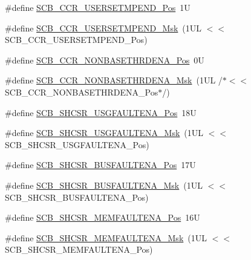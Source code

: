 \begin{DoxyCompactItemize}
\item 
\#define \hyperlink{group___c_m_s_i_s___s_c_b_ga789e41f45f59a8cd455fd59fa7652e5e}{S\+C\+B\+\_\+\+C\+C\+R\+\_\+\+U\+S\+E\+R\+S\+E\+T\+M\+P\+E\+N\+D\+\_\+\+Pos}~1U
\item 
\#define \hyperlink{group___c_m_s_i_s___s_c_b_ga4cf59b6343ca962c80e1885710da90aa}{S\+C\+B\+\_\+\+C\+C\+R\+\_\+\+U\+S\+E\+R\+S\+E\+T\+M\+P\+E\+N\+D\+\_\+\+Msk}~(1\+U\+L $<$$<$ S\+C\+B\+\_\+\+C\+C\+R\+\_\+\+U\+S\+E\+R\+S\+E\+T\+M\+P\+E\+N\+D\+\_\+\+Pos)
\item 
\#define \hyperlink{group___c_m_s_i_s___s_c_b_gab4615f7deb07386350365b10240a3c83}{S\+C\+B\+\_\+\+C\+C\+R\+\_\+\+N\+O\+N\+B\+A\+S\+E\+T\+H\+R\+D\+E\+N\+A\+\_\+\+Pos}~0U
\item 
\#define \hyperlink{group___c_m_s_i_s___s_c_b_gafe0f6be81b35d72d0736a0a1e3b4fbb3}{S\+C\+B\+\_\+\+C\+C\+R\+\_\+\+N\+O\+N\+B\+A\+S\+E\+T\+H\+R\+D\+E\+N\+A\+\_\+\+Msk}~(1\+U\+L /$\ast$$<$$<$ S\+C\+B\+\_\+\+C\+C\+R\+\_\+\+N\+O\+N\+B\+A\+S\+E\+T\+H\+R\+D\+E\+N\+A\+\_\+\+Pos$\ast$/)
\item 
\#define \hyperlink{group___c_m_s_i_s___s_c_b_gae71949507636fda388ec11d5c2d30b52}{S\+C\+B\+\_\+\+S\+H\+C\+S\+R\+\_\+\+U\+S\+G\+F\+A\+U\+L\+T\+E\+N\+A\+\_\+\+Pos}~18U
\item 
\#define \hyperlink{group___c_m_s_i_s___s_c_b_ga056fb6be590857bbc029bed48b21dd79}{S\+C\+B\+\_\+\+S\+H\+C\+S\+R\+\_\+\+U\+S\+G\+F\+A\+U\+L\+T\+E\+N\+A\+\_\+\+Msk}~(1\+U\+L $<$$<$ S\+C\+B\+\_\+\+S\+H\+C\+S\+R\+\_\+\+U\+S\+G\+F\+A\+U\+L\+T\+E\+N\+A\+\_\+\+Pos)
\item 
\#define \hyperlink{group___c_m_s_i_s___s_c_b_ga3d32edbe4a5c0335f808cfc19ec7e844}{S\+C\+B\+\_\+\+S\+H\+C\+S\+R\+\_\+\+B\+U\+S\+F\+A\+U\+L\+T\+E\+N\+A\+\_\+\+Pos}~17U
\item 
\#define \hyperlink{group___c_m_s_i_s___s_c_b_ga43e8cbe619c9980e0d1aacc85d9b9e47}{S\+C\+B\+\_\+\+S\+H\+C\+S\+R\+\_\+\+B\+U\+S\+F\+A\+U\+L\+T\+E\+N\+A\+\_\+\+Msk}~(1\+U\+L $<$$<$ S\+C\+B\+\_\+\+S\+H\+C\+S\+R\+\_\+\+B\+U\+S\+F\+A\+U\+L\+T\+E\+N\+A\+\_\+\+Pos)
\item 
\#define \hyperlink{group___c_m_s_i_s___s_c_b_ga685b4564a8760b4506f14ec4307b7251}{S\+C\+B\+\_\+\+S\+H\+C\+S\+R\+\_\+\+M\+E\+M\+F\+A\+U\+L\+T\+E\+N\+A\+\_\+\+Pos}~16U
\item 
\#define \hyperlink{group___c_m_s_i_s___s_c_b_gaf084424fa1f69bea36a1c44899d83d17}{S\+C\+B\+\_\+\+S\+H\+C\+S\+R\+\_\+\+M\+E\+M\+F\+A\+U\+L\+T\+E\+N\+A\+\_\+\+Msk}~(1\+U\+L $<$$<$ S\+C\+B\+\_\+\+S\+H\+C\+S\+R\+\_\+\+M\+E\+M\+F\+A\+U\+L\+T\+E\+N\+A\+\_\+\+Pos)

\end{DoxyCompactItemize}
